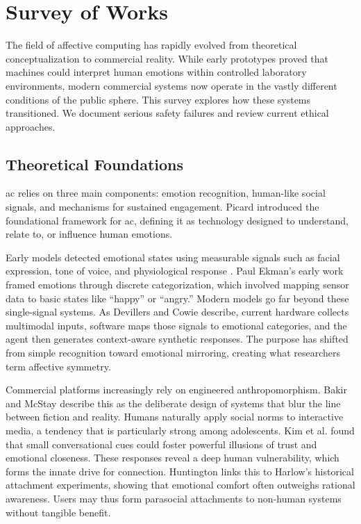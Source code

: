 \section{Survey of Works}
\label{sec:survey}

The field of affective computing has rapidly evolved from theoretical conceptualization to commercial reality. While early prototypes proved that machines could interpret human emotions within controlled laboratory environments, modern commercial systems now operate in the vastly different conditions of the public sphere. This survey explores how these systems transitioned. We document serious safety failures and review current ethical approaches.

\subsection{Theoretical Foundations}

\gls{ac} relies on three main components: emotion recognition, human-like social signals, and mechanisms for sustained engagement. Picard \cite[p.~1]{picard_affective_1995} introduced the foundational framework for \gls{ac}, defining it as technology designed to understand, relate to, or influence human emotions.

Early models detected emotional states using measurable signals such as facial expression, tone of voice, and physiological response \cite[p.~5]{picard_affective_1995}. Paul Ekman's \cite[p.~170]{ekman_argument_1992} early work framed emotions through discrete categorization, which involved mapping sensor data to basic states like ``happy'' or ``angry.'' Modern models go far beyond these single-signal systems. As Devillers and Cowie \cite[p.~1445]{devillers_ethical_2023} describe, current hardware collects multimodal inputs, software maps those signals to emotional categories, and the agent then generates context-aware synthetic responses. The purpose has shifted from simple recognition toward emotional mirroring, creating what researchers term affective symmetry.

Commercial platforms increasingly rely on engineered anthropomorphism. Bakir and McStay \cite[p.~6370]{bakir_move_2025} describe this as the deliberate design of systems that blur the line between fiction and reality. Humans naturally apply social norms to interactive media, a tendency that is particularly strong among adolescents. Kim et al. \cite[p.~15]{kim_i_2025} found that small conversational cues could foster powerful illusions of trust and emotional closeness. These responses reveal a deep human vulnerability, which forms the innate drive for connection. Huntington \cite[p.~179]{huntington_ai_2025} links this to Harlow's historical attachment experiments, showing that emotional comfort often outweighs rational awareness. Users may thus form parasocial attachments to non-human systems without tangible benefit.

